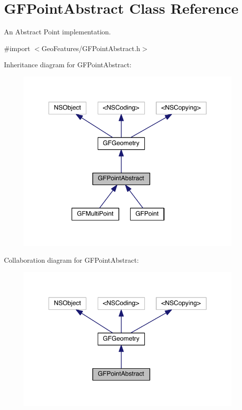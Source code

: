 \hypertarget{interface_g_f_point_abstract}{}\section{G\+F\+Point\+Abstract Class Reference}
\label{interface_g_f_point_abstract}


An Abstract Point implementation.  




{\ttfamily \#import $<$Geo\+Features/\+G\+F\+Point\+Abstract.\+h$>$}



Inheritance diagram for G\+F\+Point\+Abstract\+:
\nopagebreak
\begin{figure}[H]
\begin{center}
\leavevmode
\includegraphics[width=329pt]{interface_g_f_point_abstract__inherit__graph}
\end{center}
\end{figure}


Collaboration diagram for G\+F\+Point\+Abstract\+:\nopagebreak
\begin{figure}[H]
\begin{center}
\leavevmode
\includegraphics[width=329pt]{interface_g_f_point_abstract__coll__graph}
\end{center}
\end{figure}
